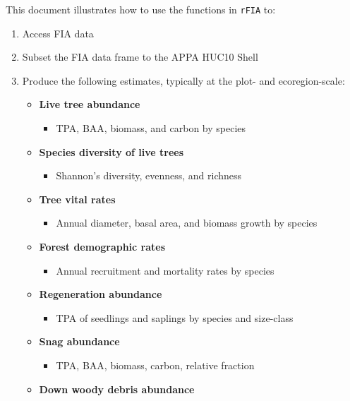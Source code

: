 \documentclass[
]{book}
\providecommand{\tightlist}{%
  \setlength{\itemsep}{0pt}\setlength{\parskip}{0pt}}
\begin{document}
This document illustrates how to use the functions in \texttt{rFIA} to:

\begin{enumerate}
\def\labelenumi{\arabic{enumi}.}
\item
  Access FIA data
\item
  Subset the FIA data frame to the APPA HUC10 Shell
\item
  Produce the following estimates, typically at the plot- and ecoregion-scale:

  \begin{itemize}
  \tightlist
  \item
    \textbf{Live tree abundance}

    \begin{itemize}
    \tightlist
    \item
      TPA, BAA, biomass, and carbon by species
    \end{itemize}
  \item
    \textbf{Species diversity of live trees}

    \begin{itemize}
    \tightlist
    \item
      Shannon's diversity, evenness, and richness
    \end{itemize}
  \item
    \textbf{Tree vital rates}

    \begin{itemize}
    \tightlist
    \item
      Annual diameter, basal area, and biomass growth by species
    \end{itemize}
  \item
    \textbf{Forest demographic rates}

    \begin{itemize}
    \tightlist
    \item
      Annual recruitment and mortality rates by species
    \end{itemize}
  \item
    \textbf{Regeneration abundance}

    \begin{itemize}
    \tightlist
    \item
      TPA of seedlings and saplings by species and size-class
    \end{itemize}
  \item
    \textbf{Snag abundance}

    \begin{itemize}
    \tightlist
    \item
      TPA, BAA, biomass, carbon, relative fraction
    \end{itemize}
  \item
    \textbf{Down woody debris abundance}


\end{itemize}
\end{enumerate}
\end{document}
